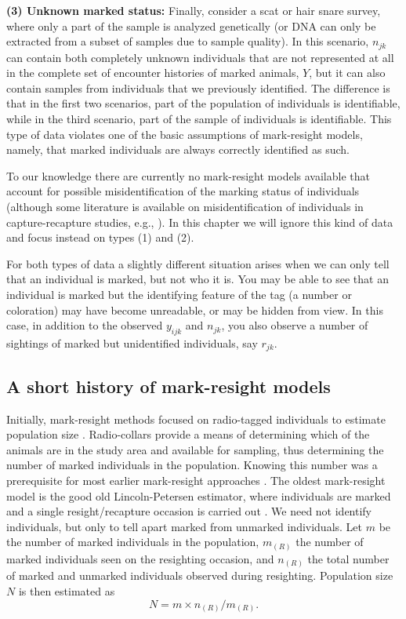 {\flushleft \bf (3) Unknown marked status:} Finally, consider a scat
or hair snare survey, where only a part of the sample is analyzed
genetically (or DNA can only be extracted from a subset of samples due
to sample quality). In this scenario, $n_{jk}$ can contain both
completely unknown individuals that are not represented at all in the
complete set of encounter histories of marked animals, {\bf $Y$}, but
it can also contain samples from individuals that we previously
identified. The difference is that in the first two scenarios, part of
the population of individuals is identifiable, while in the third
scenario, part of the sample of individuals is identifiable. This type
of data violates one of the basic assumptions of mark-resight models,
namely, that marked individuals are always correctly identified as
such.

To our knowledge there are currently no mark-resight models available
that account for possible misidentification of the marking status of
individuals (although some literature is available on
misidentification of individuals in capture-recapture studies, e.g.,
\citealp{yoshizaki_etal:2009, lukacs_burnham:2005,
  link_etal:2010}). In this chapter we will ignore this kind of data
and focus instead on types (1) and (2).

For both types of data a slightly different situation arises when
we can only tell that an individual is marked, but not
who it is. You may be able to see that an individual is marked but the
identifying feature of the tag (a number or coloration) may have
become unreadable, or may be hidden from view. In this case, in
addition to the observed $y_{ijk}$ and $n_{jk}$, you also observe a number of
sightings of marked but unidentified individuals, say $r_{jk}$.

\subsection{A short history of mark-resight models}

Initially, mark-resight methods focused on radio-tagged individuals to
estimate population size \citep{white_shenk:2001}. Radio-collars
provide a means of determining which of the animals are in the study
area and available for sampling, thus determining the number of marked
individuals in the population. Knowing this number was a prerequisite
for most earlier mark-resight approaches \citep{white:1996}. The
oldest mark-resight model is the good old Lincoln-Petersen estimator,
where individuals are marked and a single resight/recapture occasion
is carried out \citep{krebs:1999}. We need not identify individuals,
but only to tell apart marked from unmarked individuals. Let $m$ be
the number of marked individuals in the population, $m_{(R)}$ the
number of marked individuals seen on the resighting occasion, and
$n_{(R)}$ the total number of marked and unmarked individuals observed
during resighting. Population size $N$ is then estimated as
\[
N = m \times n_{(R)}/m_{(R)}.
\]

